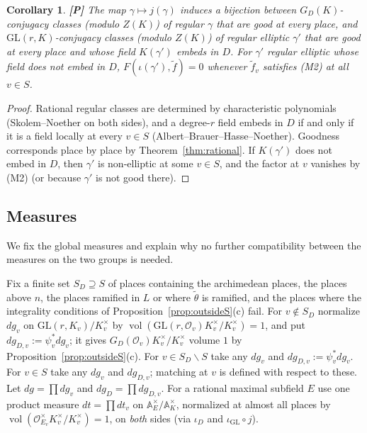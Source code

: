 \documentclass[12pt]{article}
\newcommand{\A}{\mathbb{A}}
\newcommand{\cO}{\mathcal{O}}
\newcommand{\vol}{\operatorname{vol}}
\newcommand{\GL}{\mathrm{GL}}
\newcommand{\iD}{\iota_D}
\newcommand{\iG}{\iota_{\GL}}
\newcommand{\Pv}{\textbf{[P]}}
\theoremstyle{plain}
\newtheorem{corollary}[theorem]{Corollary}
\theoremstyle{definition}
\begin{document}
\begin{corollary}\label{cor:rationalbij}\Pv
The map $\gamma\mapsto j(\gamma)$ induces a bijection between $G_D(K)$-conjugacy classes (modulo $Z(K)$) of regular $\gamma$ that are good at every place, and $\GL(r,K)$-conjugacy classes (modulo $Z(K)$) of regular elliptic $\gamma'$ that are good at every place and whose field $K(\gamma')$ embeds in $D$. For $\gamma'$ regular elliptic whose field does not embed in $D$, $F(\iota(\gamma'),\tilde f)=0$ whenever $\tilde f_v$ satisfies (M2) at all $v\in S$.
\end{corollary}
\begin{proof}
Rational regular classes are determined by characteristic polynomials (Skolem--Noether on both sides), and a degree-$r$ field embeds in $D$ if and only if it is a field locally at every $v\in S$ (Albert--Brauer--Hasse--Noether). Goodness corresponds place by place by Theorem~\ref{thm:rational}. If $K(\gamma')$ does not embed in $D$, then $\gamma'$ is non-elliptic at some $v\in S$, and the factor at $v$ vanishes by (M2) (or because $\gamma'$ is not good there).
\end{proof}

\subsection{Measures}\label{subsec:measures}
We fix the global measures and explain why no further compatibility between the measures on the two groups is needed.

Fix a finite set $S_D\supseteq S$ of places containing the archimedean places, the places above $n$, the places ramified in $L$ or where $\tilde\theta$ is ramified, and the places where the integrality conditions of Proposition~\ref{prop:outsideS}(c) fail. For $v\notin S_D$ normalize $dg_v$ on $\GL(r,K_v)/K_v^\times$ by $\vol(\GL(r,\cO_v)K_v^\times/K_v^\times)=1$, and put $dg_{D,v}:=\psi_v^*dg_v$; it gives $G_D(\cO_v)K_v^\times/K_v^\times$ volume $1$ by Proposition~\ref{prop:outsideS}(c). For $v\in S_D\smallsetminus S$ take any $dg_v$ and $dg_{D,v}:=\psi_v^*dg_v$. For $v\in S$ take any $dg_v$ and $dg_{D,v}$; matching at $v$ is defined with respect to these. Let $dg=\prod dg_v$ and $dg_D=\prod dg_{D,v}$. For a rational maximal subfield $E$ use one product measure $dt=\prod dt_v$ on $\A_E^\times/\A_K^\times$, normalized at almost all places by $\vol(\cO_{E_v}^\times K_v^\times/K_v^\times)=1$, on \emph{both} sides (via $\iD$ and $\iG\circ j$).
\end{document}
